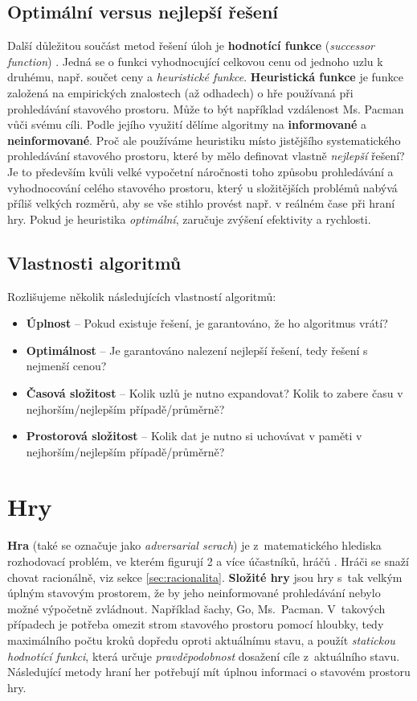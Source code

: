 \subsection*{Optimální versus nejlepší řešení}
Další důležitou součást metod řešení úloh je \textbf{hodnotící funkce} (\textit{successor function}) \cite{AI1}. Jedná se o funkci vyhodnocující celkovou cenu od jednoho uzlu k druhému, např. součet ceny a \textit{heuristické funkce}.
\textbf{Heuristická funkce} je funkce založená na empirických znalostech (až odhadech) o hře používaná při prohledávání stavového prostoru. Může to být například vzdálenost Ms. Pacman vůči svému cíli. Podle jejího využití dělíme algoritmy na \textbf{informované} a \textbf{neinformované}.
Proč ale používáme heuristiku místo jistějšího systematického prohledávání stavového prostoru, které by mělo definovat vlastně \textit{nejlepší} řešení? Je to především kvůli velké vypočetní náročnosti toho způsobu prohledávání a vyhodnocování celého stavového prostoru, který u složitějších problémů nabývá příliš velkých rozměrů, aby se vše stihlo provést např. v reálném čase při hraní hry. Pokud je heuristika \textit{optimální}, zaručuje zvýšení efektivity a rychlosti.
\newpage
\subsection*{Vlastnosti algoritmů}
Rozlišujeme několik následujících vlastností algoritmů:
\begin{itemize}
\item \textbf{Úplnost} – Pokud existuje řešení, je garantováno, že ho algoritmus vrátí?
\item \textbf{Optimálnost} – Je garantováno nalezení nejlepší řešení, tedy řešení s nejmenší cenou?
\item \textbf{Časová složitost} – Kolik uzlů je nutno expandovat? Kolik to zabere času v nejhorším/nejlepším případě/průměrně?
\item \textbf{Prostorová složitost} – Kolik dat je nutno si uchovávat v paměti v nejhorším/nejlepším případě/průměrně?
\end{itemize}

\section{Hry}
\textbf{Hra} (také se označuje jako \textit{adversarial serach}) je z matematického hlediska rozhodovací problém, ve kterém figurují 2 a více účastníků, hráčů \cite{AI1}. Hráči se snaží chovat racionálně, viz sekce \ref{sec:racionalita}.
\newline
\textbf{Složité hry} \cite{AI1} jsou hry s tak velkým úplným stavovým prostorem, že by jeho neinformované prohledávání nebylo možné výpočetně zvládnout. Například šachy, Go, Ms. Pacman. V takových případech je potřeba omezit strom stavového prostoru pomocí hloubky, tedy maximálního počtu kroků dopředu oproti aktuálnímu stavu, a použít \textit{statickou hodnotící funkci}, která určuje \textit{pravděpodobnost} dosažení cíle z aktuálního stavu. Následující metody hraní her potřebují mít úplnou informaci o stavovém prostoru hry.
